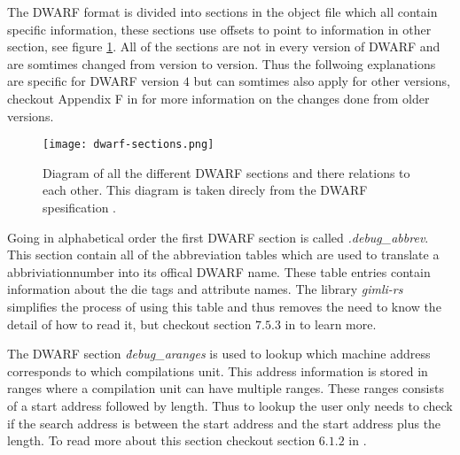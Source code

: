  


The \gls{DWARF} format is divided into sections in the object file which all contain specific information, these sections use offsets to point to information in other section, see figure \ref{fig:dwarfsections}.
All of the sections are not in every version of \gls{DWARF} and are somtimes changed from version to version.
Thus the follwoing explanations are specific for \gls{DWARF} version $4$ but can somtimes also apply for other versions, checkout Appendix F in \cite{dwarf} for more information on the changes done from older versions.


\begin{figure}[h]
	\centering
	\texttt{[image: dwarf-sections.png]}
	\caption{Diagram of all the different \gls{DWARF} sections and there relations to each other. This diagram is taken direcly from the \gls{DWARF} spesification \cite{dwarf}.}
	\label{fig:dwarfsections}
\end{figure}


Going in alphabetical order the first \gls{DWARF} section is called \emph{.debug\_abbrev}.
This section contain all of the abbreviation tables which are used to translate a abbriviationnumber into its offical \gls{DWARF} name.
These table entries contain information about the \gls{die} tags and attribute names.
The library \emph{gimli-rs} \cite{gimli} simplifies the process of using this table and thus removes the need to know the detail of how to read it, but checkout section $7.5.3$ in \cite{dwarf} to learn more.


The \gls{DWARF} section \emph{\.debug\_aranges} is used to lookup which machine address corresponds to which compilations unit.
This address information is stored in ranges where a compilation unit can have multiple ranges.
These ranges consists of a start address followed by length.
Thus to lookup the user only needs to check if the search address is between the start address and the start address plus the length.
To read more about this section checkout section $6.1.2$ in \cite{dwarf}.


